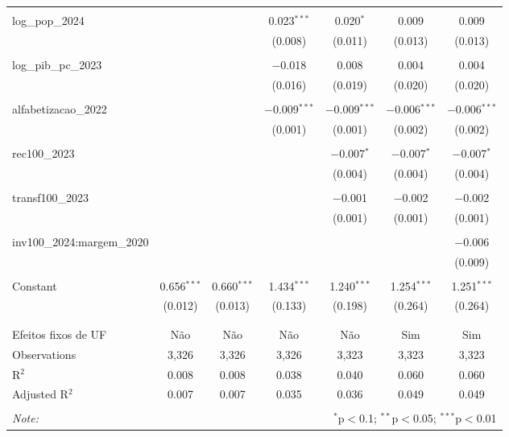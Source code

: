 \begin{table}[!htbp]
\begin{tabular}{@{\extracolsep{5pt}}lcccccc}
  & & & & & & \\ 
 log\_pop\_2024 &  &  & 0.023$^{***}$ & 0.020$^{*}$ & 0.009 & 0.009 \\ 
  &  &  & (0.008) & (0.011) & (0.013) & (0.013) \\ 
  & & & & & & \\ 
 log\_pib\_pc\_2023 &  &  & $-$0.018 & 0.008 & 0.004 & 0.004 \\ 
  &  &  & (0.016) & (0.019) & (0.020) & (0.020) \\ 
  & & & & & & \\ 
 alfabetizacao\_2022 &  &  & $-$0.009$^{***}$ & $-$0.009$^{***}$ & $-$0.006$^{***}$ & $-$0.006$^{***}$ \\ 
  &  &  & (0.001) & (0.001) & (0.002) & (0.002) \\ 
  & & & & & & \\ 
 rec100\_2023 &  &  &  & $-$0.007$^{*}$ & $-$0.007$^{*}$ & $-$0.007$^{*}$ \\ 
  &  &  &  & (0.004) & (0.004) & (0.004) \\ 
  & & & & & & \\ 
 transf100\_2023 &  &  &  & $-$0.001 & $-$0.002 & $-$0.002 \\ 
  &  &  &  & (0.001) & (0.001) & (0.001) \\ 
  & & & & & & \\ 
 inv100\_2024:margem\_2020 &  &  &  &  &  & $-$0.006 \\ 
  &  &  &  &  &  & (0.009) \\ 
  & & & & & & \\ 
 Constant & 0.656$^{***}$ & 0.660$^{***}$ & 1.434$^{***}$ & 1.240$^{***}$ & 1.254$^{***}$ & 1.251$^{***}$ \\ 
  & (0.012) & (0.013) & (0.133) & (0.198) & (0.264) & (0.264) \\ 
  & & & & & & \\ 
\hline \\[-1.8ex] 
Efeitos fixos de UF & Não & Não & Não & Não & Sim & Sim \\ 
Observations & 3,326 & 3,326 & 3,326 & 3,323 & 3,323 & 3,323 \\ 
R$^{2}$ & 0.008 & 0.008 & 0.038 & 0.040 & 0.060 & 0.060 \\ 
Adjusted R$^{2}$ & 0.007 & 0.007 & 0.035 & 0.036 & 0.049 & 0.049 \\ 
\hline 
\hline \\[-1.8ex] 
\textit{Note:}  & \multicolumn{6}{r}{$^{*}$p$<$0.1; $^{**}$p$<$0.05; $^{***}$p$<$0.01} \\ 
\end{tabular} 
\end{table} 
